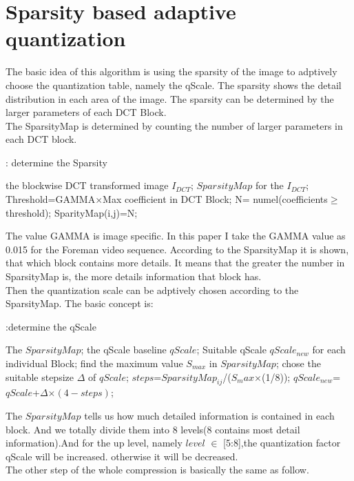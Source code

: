 \documentclass[twocolumn]{article}  %
\begin{document}
\section {Sparsity based adaptive quantization}
The basic idea of this algorithm is using the sparsity of the image to adptively choose the quantization table, namely the qScale. The sparsity shows the detail distribution in each area of the image. The sparsity can be determined by the larger parameters of each DCT Block. 
\\
The SparsityMap is determined by counting the number of larger parameters in each DCT block.
\begin{algorithm}[h]  
  \caption{: determine the Sparsity}
	\begin{algorithmic}
	\Require
      the blockwise DCT transformed image  $I_{DCT}$;
    \Ensure
     	 $SparsityMap$ for the $I_{DCT}$;
	\State
      \State Threshold=GAMMA$\times$Max coefficient in DCT Block;
      \State N= numel(coefficients$\geqslant$threshold);
	\State SparityMap(i,j)=N;
    \EndFor	
	\end{algorithmic}
\end{algorithm} 

The value GAMMA is image specific. In this paper I take the GAMMA value as 0.015 for the Foreman video sequence.  
According to the SparsityMap it is shown, that which block contains more details. It means that the greater the number in SparsityMap is, the more details information that block has. \\
Then the quantization scale can be adptively chosen according to the SparsityMap. The basic concept is:

\begin{algorithm}[h]  
  \caption{:determine the qScale}
	\begin{algorithmic}
	\Require
      The $SparsityMap$;
      the qScale baseline $qScale$;
    \Ensure
     	 Suitable qScale $qScale_{new}$ for each individual Block;
	\State
	find the maximum value $S_{max}$ in $SparsityMap$; 
	\For{$SparsityMap_{ij} \in SparsityMap$}
	\State chose the suitable stepsize  $\Delta$ of $qScale$;
     \State $steps$=$SparsityMap_{ij}$/($S_max$$\times$(1/8));
	\State $qScale_{new}$= $qScale$+$\Delta$$\times$$(4-steps)$;
    \EndFor	
	\end{algorithmic}
\end{algorithm} 
The $SparsityMap$ tells us how much detailed information is contained in each block. And we totally divide them into 8 levels(8 contains most detail information).And for the up level, namely $level$ $\in$ [5:8],the quantization factor qScale will be increased. otherwise it will be decreased.     
\\
The other step of the whole compression is basically the same as follow. 
\end{document}
